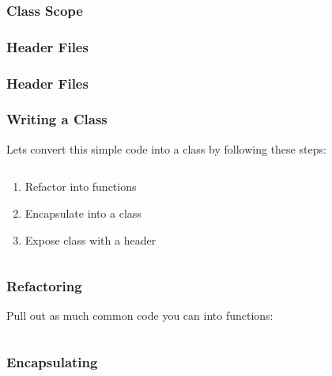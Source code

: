 \begin{frame}[fragile]
	\frametitle{Class Scope}
	
\end{frame}

\begin{frame}
	\frametitle{Header Files}
\end{frame}

\begin{frame}
	\frametitle{Header Files}
	
	
\end{frame}

\begin{frame}[fragile]
	\frametitle{Writing a Class}
	Lets convert this simple code into a class by following these steps:
	\begin{columns}[T]
		\begin{column}{0.5\textwidth}
			\begin{enumerate}
				\item Refactor into functions
				\bigskip
				\item Encapsulate into a class
				\bigskip
				\item Expose class with a header
			\end{enumerate}
		\end{column}
		\begin{column}{0.5\textwidth}
			
		\end{column}
	\end{columns}
\end{frame}

\begin{frame}[fragile]
	\frametitle{Refactoring}
	Pull out as much common code you can into functions:
	\begin{columns}[T]
		\begin{column}{0.5\textwidth}
		\end{column}
		\begin{column}{0.5\textwidth}
			
		\end{column}
	\end{columns}
\end{frame}

\begin{frame}[fragile]
	\frametitle{Encapsulating}
\end{frame}

